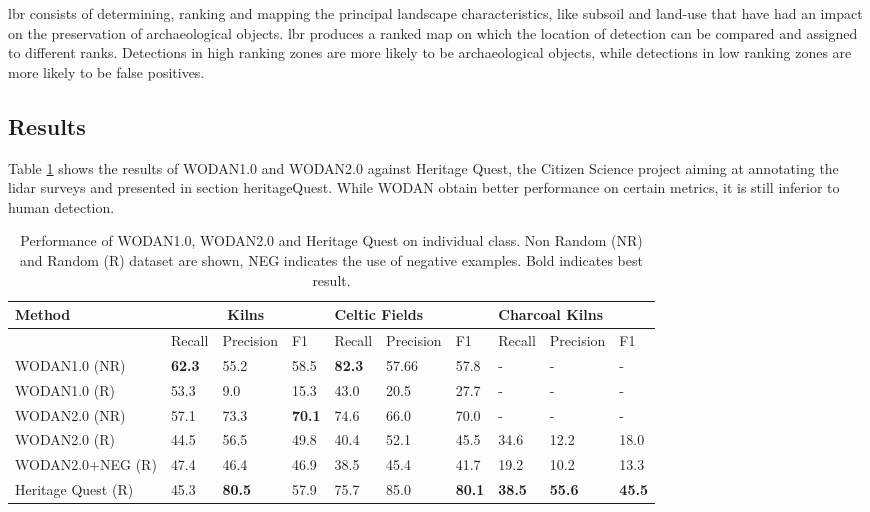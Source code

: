 \gls{lbr} consists of determining, ranking and mapping the principal landscape characteristics, like subsoil and land-use that have had an impact on the preservation of archaeological objects. \gls{lbr} produces a ranked map on which the location of detection can be compared and assigned to different ranks. Detections in high ranking zones are more likely to be archaeological objects, while detections in low ranking zones are more likely to be false positives. 
\subsection{Results}
Table \ref{tab:resWODAN2} shows the results of WODAN1.0 and WODAN2.0 against Heritage Quest, the Citizen Science project aiming at annotating the \gls{lidar} surveys and presented in section \gls{heritageQuest}. While WODAN obtain better performance on certain metrics, it is still inferior to human detection. 
\begin{table}[H]
	\centering
	\begin{tabular}{llllllllll}
		\hline
		Method             & \multicolumn{3}{c}{Kilns}                     & \multicolumn{3}{l}{Celtic Fields}         & \multicolumn{3}{l}{Charcoal Kilns}            \\ \hline
		                   & Recall        & Precision     & F1            & Recall        & Precision & F1            & Recall        & Precision     & F1            \\ \hline
				   WODAN1.0 (NR)      & \textbf{62.3} & 55.2          & 58.5          & \textbf{82.3} & 57.66     & 57.8          & -             & -             & -             \\
				   WODAN1.0 (R)       & 53.3          & 9.0           & 15.3          & 43.0          & 20.5      & 27.7          & -             & -             & -             \\ \hline
				   WODAN2.0 (NR)      & 57.1          & 73.3          & \textbf{70.1} & 74.6          & 66.0      & 70.0          & -             & -             & -             \\
				   WODAN2.0 (R)      & 44.5          & 56.5          & 49.8          & 40.4          & 52.1      & 45.5          & 34.6          & 12.2          & 18.0          \\
				   WODAN2.0+NEG (R)      & 47.4          & 46.4          & 46.9          & 38.5          & 45.4      & 41.7          & 19.2          & 10.2          & 13.3          \\ \hline
				   Heritage Quest (R) & 45.3          & \textbf{80.5} & 57.9          & 75.7          & 85.0      & \textbf{80.1} & \textbf{38.5} & \textbf{55.6} & \textbf{45.5}
	\end{tabular}
	\caption{Performance of WODAN1.0, WODAN2.0 and Heritage Quest on individual class. Non Random (NR) and Random (R) dataset are shown, NEG indicates the use of negative examples. Bold indicates best result.}
	\label{tab:resWODAN2}
\end{table}
